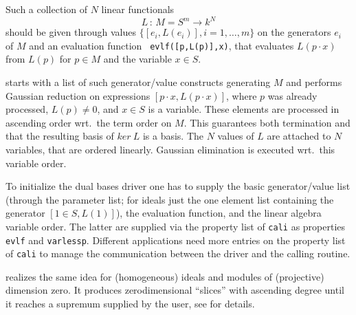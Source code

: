 Such a collection of $N$ linear functionals
\[L\,:\, M=S^m \longrightarrow k^N\]
should be given through values $\{[e_i,L(e_i)], i=1,\ldots,m\}$ on the
generators $e_i$ of $M$ and an evaluation function {\tt
evlf([p,L(p)],x)}, that evaluates $L(p\cdot x)$ from $L(p)$ for $p\in
M$ and the variable $x\in S$.  

 starts with a list of such generator/value constructs
generating $M$ and performs Gaussian reduction on expressions $[p\cdot
x,L(p\cdot x)]$, where $p$ was already processed, $L(p)\neq 0$, and
$x\in S$ is a variable. These elements are processed in ascending order
wrt.\ the term order on $M$. This guarantees both termination and that
the resulting basis of $ker\ L$ is a \gr basis. The $N$ values of $L$
are attached to $N$ variables, that are ordered linearly. Gaussian
elimination is executed wrt.\ this variable order.

To initialize the dual bases driver one has to supply the basic
generator/value list (through the parameter list; for ideals just the
one element list containing the generator $[1\in S,L(1)]$), the
evaluation function, and the linear algebra variable order. The latter
are supplied via the property list of {\tt cali} as properties {\tt
evlf} and {\tt varlessp}. Different applications need more entries
on the property list of {\tt cali} to manage the communication between
the driver and the calling routine.

 realizes the same idea for (homogeneous) ideals and
modules of (projective) dimension zero. It produces zerodimensional
``slices'' with ascending degree until it reaches a supremum supplied
by the user, see \cite{MMM} for details.
\medskip

